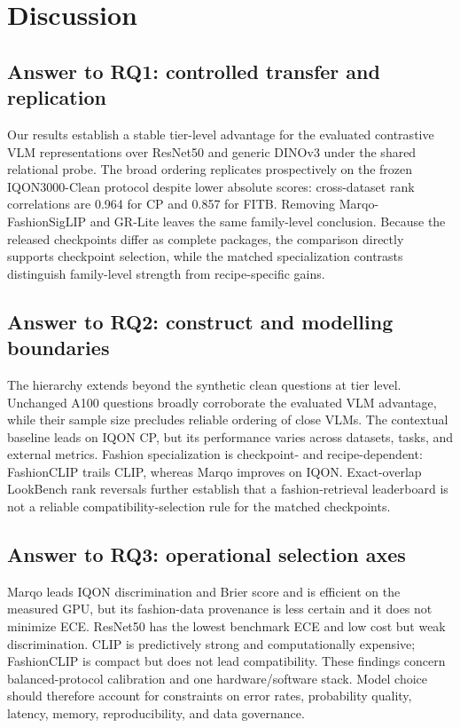 \documentclass[preprint,12pt]{elsarticle}
\begin{document}
\section{Discussion}\label{sec:discussion}

\subsection{Answer to RQ1: controlled transfer and replication}

Our results establish a stable tier-level advantage for the evaluated contrastive VLM representations over ResNet50 and generic DINOv3 under the shared relational probe. The broad ordering replicates prospectively on the frozen IQON3000-Clean protocol despite lower absolute scores: cross-dataset rank correlations are 0.964 for CP and 0.857 for FITB. Removing Marqo-FashionSigLIP and GR-Lite leaves the same family-level conclusion. Because the released checkpoints differ as complete packages, the comparison directly supports checkpoint selection, while the matched specialization contrasts distinguish family-level strength from recipe-specific gains.

\subsection{Answer to RQ2: construct and modelling boundaries}

The hierarchy extends beyond the synthetic clean questions at tier level. Unchanged A100 questions broadly corroborate the evaluated VLM advantage, while their sample size precludes reliable ordering of close VLMs. The contextual baseline leads on IQON CP, but its performance varies across datasets, tasks, and external metrics. Fashion specialization is checkpoint- and recipe-dependent: FashionCLIP trails CLIP, whereas Marqo improves on IQON. Exact-overlap LookBench rank reversals further establish that a fashion-retrieval leaderboard is not a reliable compatibility-selection rule for the matched checkpoints.

\subsection{Answer to RQ3: operational selection axes}

Marqo leads IQON discrimination and Brier score and is efficient on the measured GPU, but its fashion-data provenance is less certain and it does not minimize ECE. ResNet50 has the lowest benchmark ECE and low cost but weak discrimination. CLIP is predictively strong and computationally expensive; FashionCLIP is compact but does not lead compatibility. These findings concern balanced-protocol calibration and one hardware/software stack. Model choice should therefore account for constraints on error rates, probability quality, latency, memory, reproducibility, and data governance.
\end{document}
